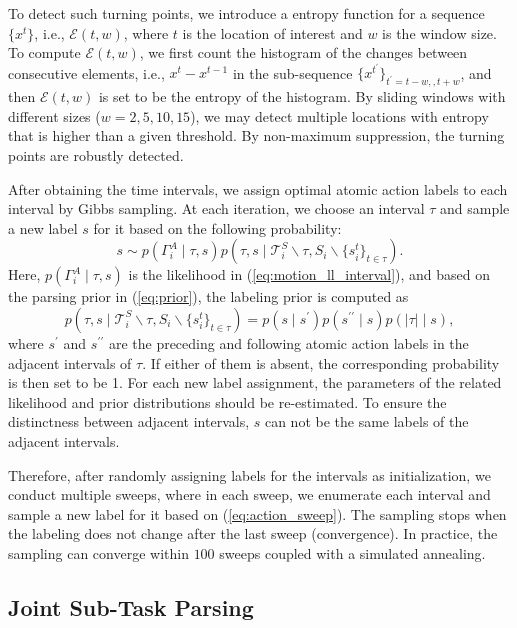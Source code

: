 \documentclass[letterpaper, 10 pt, conference]{ieeeconf}  %
\begin{document}
To detect such turning points, we introduce a entropy function for a sequence $\{x^t\}$, i.e., $\mathcal{E}(t, w)$, where $t$ is the location of interest and $w$ is the window size. To compute $\mathcal{E}(t, w)$, we first count the histogram of the changes between consecutive elements, i.e., $x^t - x^{t-1}$ in the sub-sequence $\{x^{t^\prime}\}_{t^\prime=t-w,, t+w}$, and then $\mathcal{E}(t, w)$ is set to be the entropy of the histogram. By sliding windows with different sizes ($w = 2, 5, 10, 15$), we may detect multiple locations with entropy that is higher than a given threshold. By non-maximum suppression, the turning points are robustly detected.

After obtaining the time intervals, we assign optimal atomic action labels to each interval by Gibbs sampling. At each iteration, we choose an interval $\tau$ and sample a new label $s$ for it based on the following probability:
\begin{equation}
s \sim p(\Gamma_i^A \mid \tau, s)p(\tau, s \mid \mathcal{T}_i^S \backslash	 \tau, S_i \backslash \{s_i^t\}_{t \in \tau}).
\label{eq:action_sweep}
\end{equation}
Here, $p(\Gamma_i^A \mid \tau, s)$ is the likelihood in (\ref{eq:motion_ll_interval}), and based on the parsing prior in (\ref{eq:prior}), the labeling prior is computed as
\begin{equation}
p(\tau, s \mid \mathcal{T}_i^S \backslash \tau, S_i \backslash \{s_i^t\}_{t \in \tau}) = p(s \mid s^\prime) p(s^{\prime\prime} \mid s)p(|\tau| \mid s),
\end{equation}
where $s^\prime$ and $s^{\prime\prime}$ are the preceding and following atomic action labels in the adjacent intervals of $\tau$. If either of them is absent, the corresponding probability is then set to be 1. For each new label assignment, the parameters of the related likelihood and prior distributions should be re-estimated. To ensure the distinctness between adjacent intervals, $s$ can not be the same labels of the adjacent intervals. 

Therefore, after randomly assigning labels for the intervals as initialization, we conduct multiple sweeps, where in each sweep, we enumerate each interval and sample a new label for it based on (\ref{eq:action_sweep}). The sampling stops when the labeling does not change after the last sweep (convergence). In practice, the sampling can converge within $100$ sweeps coupled with a simulated annealing.

\subsection{Joint Sub-Task Parsing}
\end{document}
